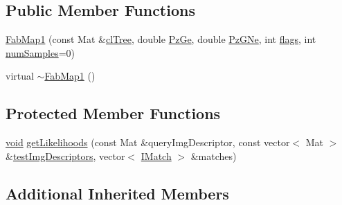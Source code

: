 \subsection*{Public Member Functions}
\begin{DoxyCompactItemize}
\item 
\hyperlink{classcv_1_1of2_1_1FabMap1_a51298ef8f2de95b00caab23a91e3163b}{Fab\-Map1} (const Mat \&\hyperlink{classcv_1_1of2_1_1FabMap_a54e4331990e8069be69fec53b545c2bd}{cl\-Tree}, double \hyperlink{classcv_1_1of2_1_1FabMap_a0c79d4180f0ffe49bfbfe541b9981e7b}{Pz\-Ge}, double \hyperlink{classcv_1_1of2_1_1FabMap_a0bf851f305f6a00d5a837a7c70e40f3d}{Pz\-G\-Ne}, int \hyperlink{highgui__c_8h_ae51e3a2d4365e85db9630dd3ce9508db}{flags}, int \hyperlink{classcv_1_1of2_1_1FabMap_a023e2c53333bb5505baceb182011980f}{num\-Samples}=0)
\item 
virtual \hyperlink{classcv_1_1of2_1_1FabMap1_a7d393882cddbd33a8e35b353c9021f3c}{$\sim$\-Fab\-Map1} ()
\end{DoxyCompactItemize}
\subsection*{Protected Member Functions}
\begin{DoxyCompactItemize}
\item 
\hyperlink{legacy_8hpp_a8bb47f092d473522721002c86c13b94e}{void} \hyperlink{classcv_1_1of2_1_1FabMap1_aa944800199525e2c6471e8a7ac1cefda}{get\-Likelihoods} (const Mat \&query\-Img\-Descriptor, const vector$<$ Mat $>$ \&\hyperlink{classcv_1_1of2_1_1FabMap_a46f350e86965ec1e00ae4bd629dd4c8d}{test\-Img\-Descriptors}, vector$<$ \hyperlink{structcv_1_1of2_1_1IMatch}{I\-Match} $>$ \&matches)
\end{DoxyCompactItemize}
\subsection*{Additional Inherited Members}


